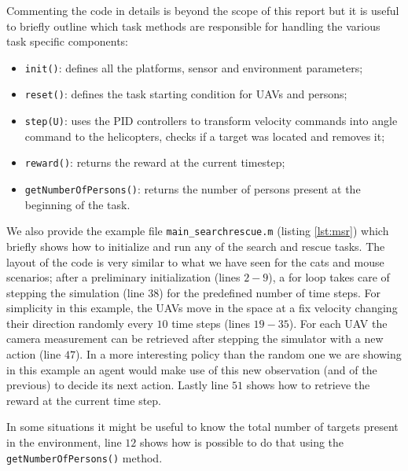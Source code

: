 \documentclass[a4paper,11pt]{report}
\newcommand\mytexttt[1]{\texttt{\hyphenchar\font=45\relax #1}}
\begin{document}
Commenting the code in details is beyond the scope of this report but it is useful to briefly outline which task methods are responsible for handling the various task specific components:
\begin{itemize}
\item\mytexttt{init()}: defines all the platforms, sensor and environment parameters;
\item\mytexttt{reset()}: defines the task starting condition for UAVs and persons;
\item\mytexttt{step(U)}: uses the PID controllers to transform velocity commands into angle command to the helicopters, checks if a target was located and removes it;
\item\mytexttt{reward()}: returns the reward at the current timestep;
\item\mytexttt{getNumberOfPersons()}: returns the number of persons present at the beginning of the task.
\end{itemize}

We also provide the example file \texttt{main\_searchrescue.m} (listing \ref{lst:msr}) which briefly shows how to initialize and run any of the search and rescue tasks.
The layout of the code is very similar to what we have seen for the cats and mouse scenarios; after a preliminary initialization (lines $2-9$), a for loop takes care of stepping the simulation (line $38$) for the predefined number of time steps.
For simplicity in this example, the UAVs move in the space at a fix velocity changing their direction randomly every $10$ time steps (lines $19-35$).
For each UAV the camera measurement can be retrieved after stepping the simulator with a new action (line $47$). In a more interesting policy than the random one we are showing in this example an agent would make use of this new observation (and of the previous) to decide its next action.
Lastly line $51$ shows how to retrieve the reward at the current time step. 

In some situations it might be useful to know the total number of targets present in the environment, line $12$ shows how is possible to do that using the \texttt{getNumberOfPersons()} method.
\end{document}
